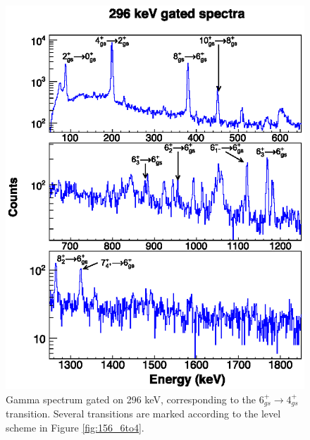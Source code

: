 \begin{figure}
    \includegraphics[scale=1.3]{156GdTablesAndFigs/296_gamma.eps}
    \caption{Gamma spectrum gated on 296 keV, corresponding to the $6^+_{gs}\rightarrow 4^+_{gs}$ transition. Several transitions are marked according to the level scheme in Figure \ref{fig:156_6to4}.}
    \label{fig:156_6to4spec}
\end{figure}